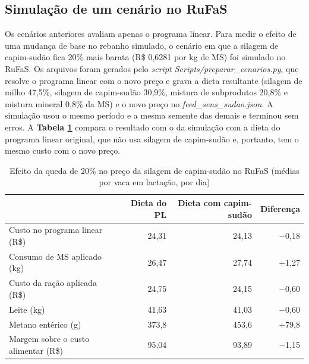 \documentclass[a4paper,12pt]{article}
\begin{document}
\subsection{Simulação de um cenário no RuFaS}\label{sec:sudao}

Os cenários anteriores avaliam apenas o programa linear. Para medir o efeito de uma mudança de base no rebanho simulado, o cenário em que a silagem de capim-sudão fica 20\% mais barata (R\$ 0,6281 por kg de MS) foi simulado no RuFaS. Os arquivos foram gerados pelo \textit{script Scripts/\allowbreak preparar\_\allowbreak cenarios.py}, que resolve o programa linear com o novo preço e grava a dieta resultante (silagem de milho 47,5\%, silagem de capim-sudão 30,9\%, mistura de subprodutos 20,8\% e mistura mineral 0,8\% da MS) e o novo preço no \textit{feed\_\allowbreak sens\_\allowbreak sudao.json}. A simulação usou o mesmo período e a mesma semente das demais e terminou sem erros. A \textbf{Tabela \ref{tab:sudao}} compara o resultado com o da simulação com a dieta do programa linear original, que não usa silagem de capim-sudão e, portanto, tem o mesmo custo com o novo preço.

\begin{table}[htbp]
    \centering
    \caption{Efeito da queda de 20\% no preço da silagem de capim-sudão no RuFaS (médias por vaca em lactação, por dia)}
    \label{tab:sudao}
    \begin{tabular}{lrrr}
        \toprule
        & \textbf{Dieta do PL} & \textbf{Dieta com capim-sudão} & \textbf{Diferença} \\
        \midrule
        \rowcolor{gray!15}
        Custo no programa linear (R\$) & 24,31 & 24,13 & $-$0,18 \\
        Consumo de MS aplicado (kg) & 26,47 & 27,74 & +1,27 \\
        \rowcolor{gray!15}
        Custo da ração aplicada (R\$) & 24,75 & 24,15 & $-$0,60 \\
        Leite (kg) & 41,63 & 41,03 & $-$0,60 \\
        \rowcolor{gray!15}
        Metano entérico (g) & 373,8 & 453,6 & +79,8 \\
        Margem sobre o custo alimentar (R\$) & 95,04 & 93,89 & $-$1,15 \\
        \bottomrule
    \end{tabular}
\end{table}
\end{document}
